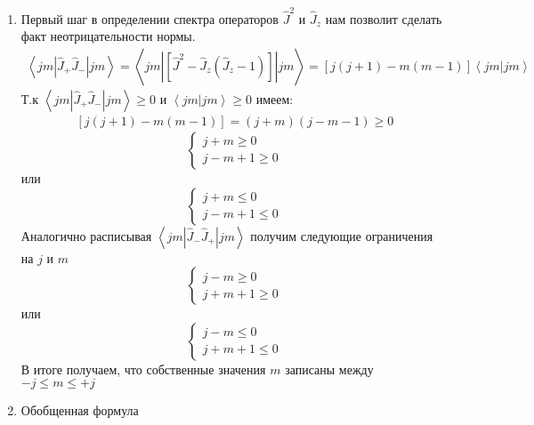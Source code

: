 \documentclass[__main__.tex]{subfiles}
\begin{document}
\begin{enumerate}
    \item Первый шаг в определении спектра операторов $\hat{J}^2$ и $\hat{J}_z$ нам позволит сделать факт неотрицательности нормы.
          \begin{gather*}
              \left<jm|\hat{J}_{+}\hat{J}_{-}|jm\right> = \left<jm\left|\left[\hat{J}^2-\hat{J}_z\left(\hat{J}_z-1\right)\right]\right|jm\right> = \left[j(j+1)-m(m-1)\right]\left<jm|jm\right>
          \end{gather*}
          Т.к $\left<jm|\hat{J}_{+}\hat{J}_{-}|jm\right> \geq 0$ и $\left<jm|jm\right> \geq 0$ имеем:
          \begin{gather*}
              \left[j(j+1)-m(m-1)\right] = (j+m)(j-m-1) \geq 0
          \end{gather*}
          \begin{equation*}
              \begin{cases}
                  j+m \geq 0 \\
                  j-m+1 \geq 0
              \end{cases}
          \end{equation*}
          или
          \begin{equation*}
              \begin{cases}
                  j+m \leq 0 \\
                  j-m+1 \leq 0
              \end{cases}
          \end{equation*}
          Аналогично расписывая $   \left<jm|\hat{J}_{-}\hat{J}_{+}|jm\right>$ получим следующие ограничения на $j$ и $m$
          \begin{equation*}
              \begin{cases}
                  j-m \geq 0 \\
                  j+m+1 \geq 0
              \end{cases}
          \end{equation*}
          или
          \begin{equation*}
              \begin{cases}
                  j-m \leq 0 \\
                  j+m+1 \leq 0
              \end{cases}
          \end{equation*}
          В итоге получаем, что собственные значения $m$ записаны между $-j\leq m \leq +j$
    \item Обобщенная формула

\end{enumerate}
\end{document}
